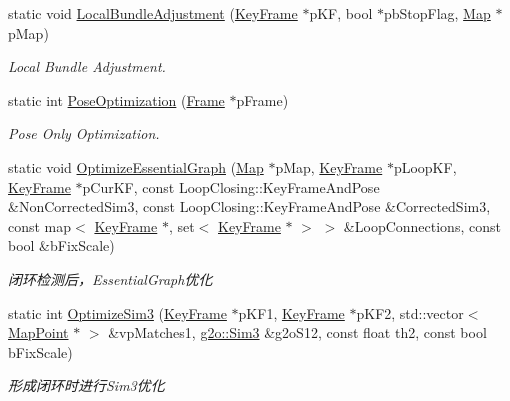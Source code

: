 \begin{DoxyCompactItemize}
\item 
static void \hyperlink{classORB__SLAM2_1_1Optimizer_ab70e0b4f366b65a0c1ae8b2def19d339}{Local\-Bundle\-Adjustment} (\hyperlink{classORB__SLAM2_1_1KeyFrame}{Key\-Frame} $\ast$p\-K\-F, bool $\ast$pb\-Stop\-Flag, \hyperlink{classORB__SLAM2_1_1Map}{Map} $\ast$p\-Map)
\begin{DoxyCompactList}\small\item\em Local Bundle Adjustment. \end{DoxyCompactList}\item 
static int \hyperlink{classORB__SLAM2_1_1Optimizer_a7415d78b8a2323b88e108fa1ea3bf2d3}{Pose\-Optimization} (\hyperlink{classORB__SLAM2_1_1Frame}{Frame} $\ast$p\-Frame)
\begin{DoxyCompactList}\small\item\em Pose Only Optimization. \end{DoxyCompactList}\item 
static void \hyperlink{classORB__SLAM2_1_1Optimizer_ad36bb1a7167c84f385c3f299bc96f20e}{Optimize\-Essential\-Graph} (\hyperlink{classORB__SLAM2_1_1Map}{Map} $\ast$p\-Map, \hyperlink{classORB__SLAM2_1_1KeyFrame}{Key\-Frame} $\ast$p\-Loop\-K\-F, \hyperlink{classORB__SLAM2_1_1KeyFrame}{Key\-Frame} $\ast$p\-Cur\-K\-F, const Loop\-Closing\-::\-Key\-Frame\-And\-Pose \&Non\-Corrected\-Sim3, const Loop\-Closing\-::\-Key\-Frame\-And\-Pose \&Corrected\-Sim3, const map$<$ \hyperlink{classORB__SLAM2_1_1KeyFrame}{Key\-Frame} $\ast$, set$<$ \hyperlink{classORB__SLAM2_1_1KeyFrame}{Key\-Frame} $\ast$ $>$ $>$ \&Loop\-Connections, const bool \&b\-Fix\-Scale)
\begin{DoxyCompactList}\small\item\em 闭环检测后，\-Essential\-Graph优化 \end{DoxyCompactList}\item 
static int \hyperlink{classORB__SLAM2_1_1Optimizer_ad8fe00ad3e6564b859b07ff9e7b2224e}{Optimize\-Sim3} (\hyperlink{classORB__SLAM2_1_1KeyFrame}{Key\-Frame} $\ast$p\-K\-F1, \hyperlink{classORB__SLAM2_1_1KeyFrame}{Key\-Frame} $\ast$p\-K\-F2, std\-::vector$<$ \hyperlink{classORB__SLAM2_1_1MapPoint}{Map\-Point} $\ast$ $>$ \&vp\-Matches1, \hyperlink{structg2o_1_1Sim3}{g2o\-::\-Sim3} \&g2o\-S12, const float th2, const bool b\-Fix\-Scale)
\begin{DoxyCompactList}\small\item\em 形成闭环时进行\-Sim3优化 \end{DoxyCompactList}\end{DoxyCompactItemize}


